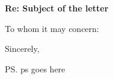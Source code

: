 \documentclass[11pt]{letter}
\begin{document}
\begin{letter}{
    \textbf{Re: Subject of the letter}
}

  \date{\today}  
  \opening{To whom it may concern:}

  \lipsum[2-4]

  \closing{Sincerely,}
  \ps{ps goes here}  %
\end{letter}
\end{document}
